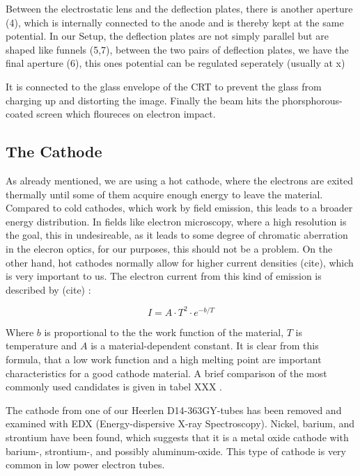 Between the electrostatic lens and the deflection plates, there is another aperture (4), which is internally connected to the anode and is thereby kept at the same potential. In our Setup, the deflection plates are not simply parallel but are shaped like funnels (5,7), between the two pairs of deflection plates, we have the final aperture (6), this ones potential can be regulated seperately  (usually at x) 


It is connected to the glass envelope of the CRT to prevent the glass from charging up and distorting the image. 
Finally the beam hits the phorsphorous-coated screen which floureces on electron impact.

\subsection{The Cathode}

As already mentioned, we are using a hot cathode, where the electrons are exited thermally until some of them acquire enough energy to leave the material. Compared to cold cathodes, which work by field emission, this leads to a broader energy distribution. In fields like electron microscopy, where a high resolution is the goal, this in undesireable, as it leads to some degree of chromatic aberration in the elecron optics, for our purposes, this should not be a problem. On the other hand, hot cathodes normally allow for higher current densities  (cite), which is very important to us. The  electron current from this kind of emission is described by (cite) : 

\begin{equation}\label{eq:thermionic_current}
I=A\cdot T^2 \cdot e^{-b/T}
\end{equation}

Where $b$ is proportional to the the work function of the material, $T$ is temperature and $A$ is a material-dependent constant. It is clear from this formula, that a low work function and a high melting point are important characteristics for a good cathode material. A brief comparison of the most commonly used candidates is given in tabel XXX .

The cathode from one of our Heerlen D14-363GY-tubes has been removed and examined with EDX (Energy-dispersive X-ray Spectroscopy). Nickel, barium, and strontium have been found, which suggests that it is a metal oxide cathode with barium-, strontium-, and possibly aluminum-oxide. This type of cathode is very common in low power electron tubes.

